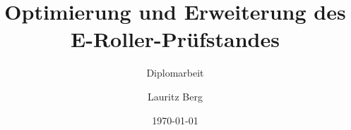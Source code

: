 \titlehead{\centering\texttt{[image: htw-logo]}}%
\subject{Hochschule für Technik und Wirtschaft Dresden\\%
		Fakultät Elektrotechnik}%
\title{Optimierung und Erweiterung des E-Roller-Prüfstandes}%
\subtitle{Diplomarbeit}%
\author{Lauritz Berg}%
\date{\today}%
\publishers{Betreuer usw. einfügen}%
\maketitle%
\newpage%
